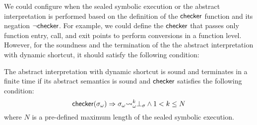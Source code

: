 We could configure when the sealed symbolic execution or the abstract
interpretation is performed based on the definition of the $\textsf{checker}$ function
and its negation $\neg\textsf{checker}$.  For example, we could define the $\textsf{checker}$
that passes only function entry, call, and exit points to perform conversions in
a function level.  However, for the soundness and the termination of the
the abstract interpretation with dynamic shortcut, it should satisfy the
following condition:
\begin{theorem}\label{theorem:shortcut}
  The abstract interpretation with dynamic shortcut is sound and terminates in a
  finite time if its abstract semantics is sound and $\textsf{checker}$ satisfies the
  following condition:
  \[
    \textsf{checker}({\sigma}_\omega) \Rightarrow {\sigma}_\omega {\leadsto}_\omega^k \bot_\sigma \wedge
    1 < k \leq N
  \]
  where $N$ is a pre-defined maximum length of the sealed symbolic execution.
\end{theorem}

